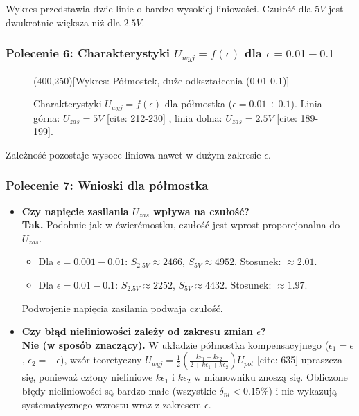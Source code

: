 \documentclass[12pt, a4paper]{article}
\begin{document}
	Wykres przedstawia dwie linie o bardzo wysokiej liniowości. Czułość dla $5 V$ jest dwukrotnie większa niż dla $2.5 V$.
	
	\subsubsection*{Polecenie 6: Charakterystyki $U_{wyj} = f(\epsilon)$ dla $\epsilon = 0.01-0.1$}
	
	\begin{figure}[H]
		\centering
		\framebox(400,250){[Wykres: Półmostek, duże odkształcenia (0.01-0.1)]}
		\caption{Charakterystyki $U_{wyj} = f(\epsilon)$ dla półmostka ($\epsilon = 0.01 \div 0.1$).  Linia górna: $U_{zas} = 5 V$ [cite: 212-230] , linia dolna: $U_{zas} = 2.5 V$ [cite: 189-199].}
	\end{figure}
	
	Zależność pozostaje wysoce liniowa nawet w dużym zakresie $\epsilon$.
	
	\subsubsection*{Polecenie 7: Wnioski dla półmostka}
	
	\begin{itemize}
		\item \textbf{Czy napięcie zasilania $U_{zas}$ wpływa na czułość?} \\
		\textbf{Tak.} Podobnie jak w ćwierćmostku, czułość jest wprost proporcjonalna do $U_{zas}$.
		\begin{itemize}
			\item Dla $\epsilon=0.001-0.01$: $S_{2.5V} \approx 2466$, $S_{5V} \approx 4952$. Stosunek: $\approx 2.01$.
			\item Dla $\epsilon=0.01-0.1$: $S_{2.5V} \approx 2252$, $S_{5V} \approx 4432$. Stosunek: $\approx 1.97$.
		\end{itemize}
		Podwojenie napięcia zasilania podwaja czułość.
		
		\item \textbf{Czy błąd nieliniowości zależy od zakresu zmian $\epsilon$?} \\
		 \textbf{Nie (w sposób znaczący).} W układzie półmostka kompensacyjnego ($\epsilon_1 = \epsilon$, $\epsilon_2 = -\epsilon$), wzór teoretyczny $U_{wyj}=\frac{1}{2}(\frac{k\epsilon_1 - k\epsilon_2}{2+k\epsilon_1+k\epsilon_2})U_{pot}$ [cite: 635] upraszcza się, ponieważ człony nieliniowe $k\epsilon_1$ i $k\epsilon_2$ w mianowniku znoszą się. Obliczone błędy nieliniowości są bardzo małe (wszystkie $\delta_{nl} < 0.15 \%$) i nie wykazują systematycznego wzrostu wraz z zakresem $\epsilon$.
	\end{itemize}
	
\end{document}
